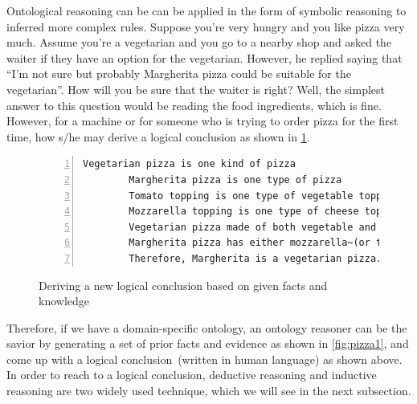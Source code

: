 \hspace*{3.5mm} Ontological reasoning can be can be applied in the form of symbolic reasoning to inferred more complex rules. Suppose you're very hungry and you like pizza very much. Assume you're a vegetarian and you go to a nearby shop and asked the waiter if they have an option for the vegetarian. However, he replied saying that ``I'm not sure but probably Margherita pizza could be suitable for the vegetarian''. How will you be sure that the waiter is right? Well, the simplest answer to this question would be reading the food ingredients, which is fine. However, for a machine or for someone who is trying to order pizza for the first time, how s/he may derive a logical conclusion as shown in \cref{fig:sparqlEx1}.  


\begin{figure}[h]
    \centering
    \scriptsize
    \begin{Verbatim}[frame=single,numbers=left]
        Vegetarian pizza is one kind of pizza 
        Margherita pizza is one type of pizza
        Tomato topping is one type of vegetable topping
        Mozzarella topping is one type of cheese topping
        Vegetarian pizza made of both vegetable and cheese topping
        Margherita pizza has either mozzarella~(or tomato) topping or both
        Therefore, Margherita is a vegetarian pizza.
    \end{Verbatim}
    \vspace{-3mm}
    \caption{Deriving a new logical conclusion based on given facts and knowledge}
    \label{fig:sparqlEx1}
\end{figure}

\hspace*{3.5mm} Therefore, if we have a domain-specific ontology, an ontology reasoner can be the savior by generating a set of prior facts and evidence as shown in \cref{fig:pizza1}, and come up with a logical conclusion~(written in human language) as shown above. In order to reach to a logical conclusion, deductive reasoning and inductive reasoning are two widely used technique, which we will see in the next subsection. 

